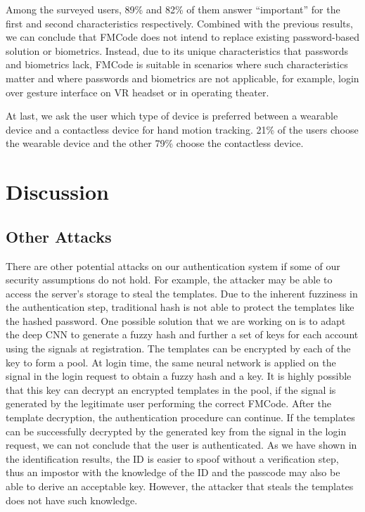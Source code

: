 \documentclass[conference]{IEEEtran}
\begin{document}
Among the surveyed users, 89\% and 82\% of them answer ``important'' for the first and second characteristics respectively. Combined with the previous results, we can conclude that FMCode does not intend to replace existing password-based solution or biometrics. Instead, due to its unique characteristics that passwords and biometrics lack, FMCode is suitable in scenarios where such characteristics matter and where passwords and biometrics are not applicable, for example, login over gesture interface on VR headset or in operating theater.

At last, we ask the user which type of device is preferred between a wearable device and a contactless device for hand motion tracking. 21\% of the users choose the wearable device and the other 79\% choose the contactless device.

\section{Discussion}

\subsection{Other Attacks}

There are other potential attacks on our authentication system if some of our security assumptions do not hold. For example, the attacker may be able to access the server's storage to steal the templates. Due to the inherent fuzziness in the authentication step, traditional hash is not able to protect the templates like the hashed password. One possible solution that we are working on is to adapt the deep CNN to generate a fuzzy hash and further a set of keys for each account using the signals at registration. The templates can be encrypted by each of the key to form a pool. At login time, the same neural network is applied on the signal in the login request to obtain a fuzzy hash and a key. It is highly possible that this key can decrypt an encrypted templates in the pool, if the signal is generated by the legitimate user performing the correct FMCode. After the template decryption, the authentication procedure can continue. If the templates can be successfully decrypted by the generated key from the signal in the login request, we can not conclude that the user is authenticated. As we have shown in the identification results, the ID is easier to spoof without a verification step, thus an impostor with the knowledge of the ID and the passcode may also be able to derive an acceptable key. However, the attacker that steals the templates does not have such knowledge.
\end{document}
